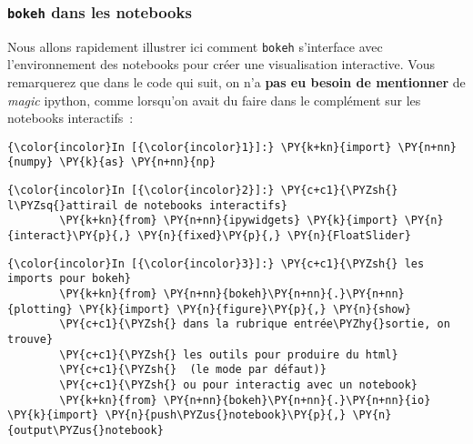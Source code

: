     \hypertarget{bokeh-dans-les-notebooks}{%
\subsubsection{\texorpdfstring{\texttt{bokeh} dans les
notebooks}{bokeh dans les notebooks}}\label{bokeh-dans-les-notebooks}}

    Nous allons rapidement illustrer ici comment \texttt{bokeh} s'interface
avec l'environnement des notebooks pour créer une visualisation
interactive. Vous remarquerez que dans le code qui suit, on n'a
\textbf{pas eu besoin de mentionner} de \emph{magic} ipython, comme
lorsqu'on avait du faire dans le complément sur les notebooks
interactifs~:

\begin{Shaded}
\begin{Highlighting}[frame=lines,framerule=0.6mm,rulecolor=\color{asisframecolor}]
\OperatorTok{%}\NormalTok{matplotlib notebook}
\end{Highlighting}
\end{Shaded}

    \begin{Verbatim}[commandchars=\\\{\},frame=single,framerule=0.3mm,rulecolor=\color{cellframecolor}]
{\color{incolor}In [{\color{incolor}1}]:} \PY{k+kn}{import} \PY{n+nn}{numpy} \PY{k}{as} \PY{n+nn}{np}
\end{Verbatim}


    \begin{Verbatim}[commandchars=\\\{\},frame=single,framerule=0.3mm,rulecolor=\color{cellframecolor}]
{\color{incolor}In [{\color{incolor}2}]:} \PY{c+c1}{\PYZsh{} l\PYZsq{}attirail de notebooks interactifs}
        \PY{k+kn}{from} \PY{n+nn}{ipywidgets} \PY{k}{import} \PY{n}{interact}\PY{p}{,} \PY{n}{fixed}\PY{p}{,} \PY{n}{FloatSlider}
\end{Verbatim}


    \begin{Verbatim}[commandchars=\\\{\},frame=single,framerule=0.3mm,rulecolor=\color{cellframecolor}]
{\color{incolor}In [{\color{incolor}3}]:} \PY{c+c1}{\PYZsh{} les imports pour bokeh}
        \PY{k+kn}{from} \PY{n+nn}{bokeh}\PY{n+nn}{.}\PY{n+nn}{plotting} \PY{k}{import} \PY{n}{figure}\PY{p}{,} \PY{n}{show}
        \PY{c+c1}{\PYZsh{} dans la rubrique entrée\PYZhy{}sortie, on trouve}
        \PY{c+c1}{\PYZsh{} les outils pour produire du html}
        \PY{c+c1}{\PYZsh{}  (le mode par défaut)}
        \PY{c+c1}{\PYZsh{} ou pour interactig avec un notebook}
        \PY{k+kn}{from} \PY{n+nn}{bokeh}\PY{n+nn}{.}\PY{n+nn}{io} \PY{k}{import} \PY{n}{push\PYZus{}notebook}\PY{p}{,} \PY{n}{output\PYZus{}notebook}
\end{Verbatim}


